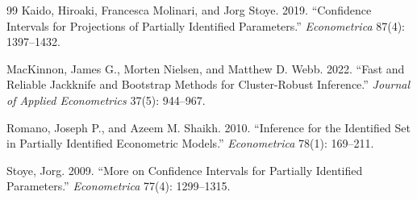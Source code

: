 \documentclass[11pt]{article}
\theoremstyle{plain}
\theoremstyle{definition}
\theoremstyle{remark}
\begin{document}
\begin{thebibliography}{99}
Kaido, Hiroaki, Francesca Molinari, and Jorg Stoye. 2019. ``Confidence Intervals
for Projections of Partially Identified Parameters.'' \emph{Econometrica} 87(4):
1397--1432.

MacKinnon, James G., Morten Nielsen, and Matthew D. Webb. 2022. ``Fast and
Reliable Jackknife and Bootstrap Methods for Cluster-Robust Inference.''
\emph{Journal of Applied Econometrics} 37(5): 944--967.

Romano, Joseph P., and Azeem M. Shaikh. 2010. ``Inference for the Identified Set
in Partially Identified Econometric Models.'' \emph{Econometrica} 78(1):
169--211.

Stoye, Jorg. 2009. ``More on Confidence Intervals for Partially Identified
Parameters.'' \emph{Econometrica} 77(4): 1299--1315.

\end{thebibliography}
\end{document}
